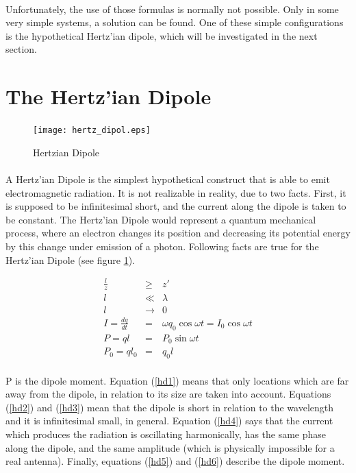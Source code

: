 \documentclass[a4paper,10pt]{thesis}
\begin{document}
\paragraph*{}
Unfortunately, the use of those formulas is normally not possible. Only in some very simple systems, a solution can be found. One of these simple configurations is the hypothetical Hertz'ian dipole, which will be investigated in the next section.

\section{\textbf{The Hertz'ian Dipole}}

\begin{figure}
\begin{center}  %
  \texttt{[image: hertz\_dipol.eps]}\\
\caption{Hertzian Dipole}\label{fig_hertz_dipol}
\end{center}
\end{figure}


\paragraph*{}
A Hertz'ian Dipole is the simplest hypothetical construct that is able to emit electromagnetic radiation. It is not realizable in reality, due to two facts. First, it is supposed to be infinitesimal short, and the current along the dipole is taken to be constant. The Hertz'ian Dipole would represent a quantum mechanical process, where an electron changes its position and decreasing its potential energy by this change under emission of a photon. Following facts are true for the Hertz'ian Dipole (see figure \ref{fig_hertz_dipol}).

\begin{eqnarray}
\frac{l}{z} &\geq& z' \label{hd1} \\
l &\ll& \lambda \label{hd2} \\
l &\rightarrow& 0 \label{hd3} \\
I=\frac{dq}{dt} &=& \omega q_0 \cos{\omega t} = I_0 \cos{\omega t} \label{hd4} \\
P=ql &=& P_0 \sin{\omega t}  \label{hd5} \\
P_0=ql_0 &=& q_0 l \label{hd6}
\end{eqnarray}

\paragraph*{}
P is the dipole moment. Equation (\ref{hd1}) means that only locations which are far away from the dipole, in relation to its size are taken into account. Equations (\ref{hd2}) and (\ref{hd3}) mean that the dipole is short in relation to the wavelength and it is infinitesimal small, in general. Equation (\ref{hd4}) says that the current which produces the radiation is oscillating harmonically, has the same phase along the dipole, and the same amplitude (which is physically impossible for a real antenna). Finally, equations (\ref{hd5}) and (\ref{hd6}) describe the dipole moment.
\end{document}
